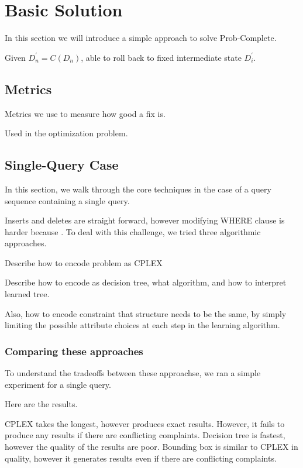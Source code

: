 \section{Basic Solution}

In this section we will introduce a simple approach to solve Prob-Complete.


Given $D^'_n = C(D_n)$, able to roll back to fixed intermediate state $D^'_i$.


\subsection{Metrics}

Metrics we use to measure how good a fix is.

Used in the optimization problem.




\subsection{Single-Query Case}

In this section, we walk through the core techniques in the case of a query sequence containing a single query.

Inserts and deletes are straight forward, however modifying WHERE clause is harder because
.  To deal with this challenge, we tried three algorithmic approaches.

Describe how to encode problem as CPLEX



Describe how to encode as decision tree, what algorithm, and how to interpret learned tree.

Also, how to encode constraint that structure needs to be the same, by simply limiting the possible attribute
choices at each step in the learning algorithm.

\subsubsection{Comparing these approaches}

To understand the tradeoffs between these approachse, we ran a simple experiment for a single query.

Here are the results.


CPLEX takes the longest, however produces exact results.  However, it fails to produce any results if there are conflicting complaints.
Decision tree is fastest, however the quality of the results are poor.
Bounding box is similar to CPLEX in quality, however it generates results even if there are conflicting complaints.








